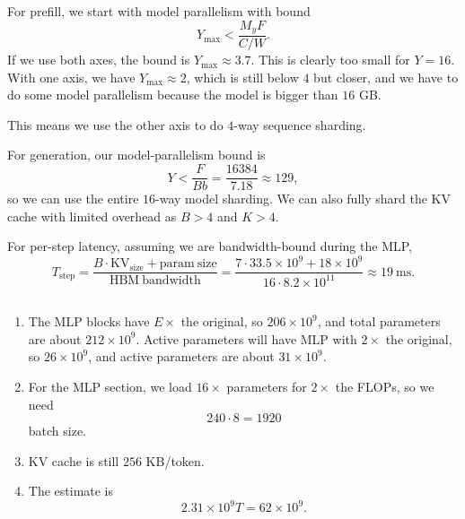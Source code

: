 \documentclass[11pt]{article}
\newcommand{\B}{B}
\newcommand{\F}{F}
\newcommand{\ms}{\mathrm{ms}}
\newcommand{\exercisebreak}{\Needspace{8\baselineskip}}
\begin{document}
For prefill, we start with model parallelism with bound
\[
  Y_{\max} < \frac{M_y\F}{C/W}.
\]
If we use both axes, the bound is $Y_{\max}\approx 3.7$. This is clearly too small for $Y=16$. With one axis, we have $Y_{\max}\approx 2$, which is still below $4$ but closer, and we have to do some model parallelism because the model is bigger than $16$ GB.

This means we use the other axis to do $4$-way sequence sharding.

For generation, our model-parallelism bound is
\[
  Y < \frac{\F}{Bb}
  =
  \frac{16384}{7.18}
  \approx 129,
\]
so we can use the entire $16$-way model sharding. We can also fully shard the KV cache with limited overhead as $\B>4$ and $K>4$.

For per-step latency, assuming we are bandwidth-bound during the MLP,
\[
  T_{\mathrm{step}}
  =
  \frac{\B\cdot \mathrm{KV}_{\mathrm{size}}+\mathrm{param\ size}}
       {\mathrm{HBM\ bandwidth}}
  =
  \frac{7\cdot 33.5\times 10^9+18\times 10^9}
       {16\cdot 8.2\times 10^{11}}
  \approx 19\ \ms.
\]

\exercisebreak
\subsection{}
\begin{enumerate}
  \item The MLP blocks have $E\times$ the original, so $206\times 10^9$, and total parameters are about $212\times 10^9$. Active parameters will have MLP with $2\times$ the original, so $26\times 10^9$, and active parameters are about $31\times 10^9$.

  \item For the MLP section, we load $16\times$ parameters for $2\times$ the FLOPs, so we need
  \[
    240\cdot 8=1920
  \]
  batch size.

  \item KV cache is still $256$ KB/token.

  \item The estimate is
  \[
    2.31\times 10^9 T = 62\times 10^9.
  \]
\end{enumerate}

\exercisebreak
\end{document}
